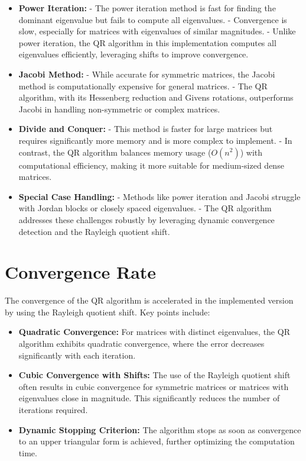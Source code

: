 \documentclass[12pt]{article}
\begin{document}
\begin{itemize}
    \item \textbf{Power Iteration:}  
    - The power iteration method is fast for finding the dominant eigenvalue but fails to compute all eigenvalues.  
    - Convergence is slow, especially for matrices with eigenvalues of similar magnitudes.  
    - Unlike power iteration, the QR algorithm in this implementation computes all eigenvalues efficiently, leveraging shifts to improve convergence.  

    \item \textbf{Jacobi Method:}  
    - While accurate for symmetric matrices, the Jacobi method is computationally expensive for general matrices.  
    - The QR algorithm, with its Hessenberg reduction and Givens rotations, outperforms Jacobi in handling non-symmetric or complex matrices.  

    \item \textbf{Divide and Conquer:}  
    - This method is faster for large matrices but requires significantly more memory and is more complex to implement.  
    - In contrast, the QR algorithm balances memory usage (\(O(n^2)\)) with computational efficiency, making it more suitable for medium-sized dense matrices.  

    \item \textbf{Special Case Handling:}  
    - Methods like power iteration and Jacobi struggle with Jordan blocks or closely spaced eigenvalues.  
    - The QR algorithm addresses these challenges robustly by leveraging dynamic convergence detection and the Rayleigh quotient shift.  
\end{itemize}

\section{Convergence Rate}
The convergence of the QR algorithm is accelerated in the implemented version by using the Rayleigh quotient shift. Key points include:  

\begin{itemize}
    \item \textbf{Quadratic Convergence:} For matrices with distinct eigenvalues, the QR algorithm exhibits quadratic convergence, where the error decreases significantly with each iteration.  
    \item \textbf{Cubic Convergence with Shifts:} The use of the Rayleigh quotient shift often results in cubic convergence for symmetric matrices or matrices with eigenvalues close in magnitude. This significantly reduces the number of iterations required.  
    \item \textbf{Dynamic Stopping Criterion:} The algorithm stops as soon as convergence to an upper triangular form is achieved, further optimizing the computation time.  
\end{itemize}
\end{document}
